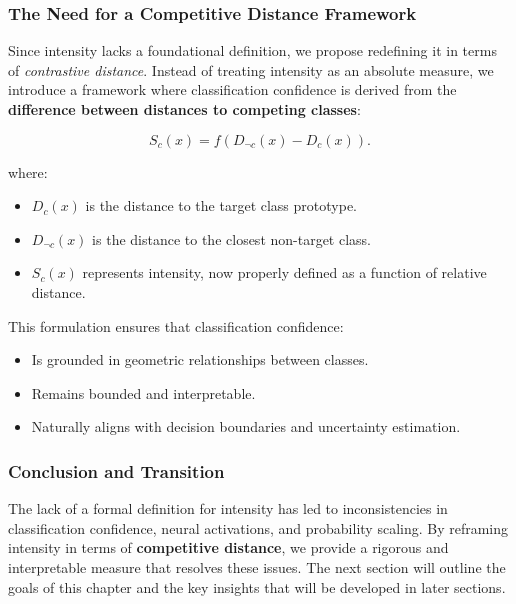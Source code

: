 \subsubsection{The Need for a Competitive Distance Framework}

Since intensity lacks a foundational definition, we propose redefining it in terms of \textit{contrastive distance}. Instead of treating intensity as an absolute measure, we introduce a framework where classification confidence is derived from the \textbf{difference between distances to competing classes}:

\[
S_c(x) = f(D_{\neg c}(x) - D_c(x)).
\]

where:

\begin{itemize}
    \item \( D_c(x) \) is the distance to the target class prototype.
    \item \( D_{\neg c}(x) \) is the distance to the closest non-target class.
    \item \( S_c(x) \) represents intensity, now properly defined as a function of relative distance.
\end{itemize}

This formulation ensures that classification confidence:

\begin{itemize}
    \item Is grounded in geometric relationships between classes.
    \item Remains bounded and interpretable.
    \item Naturally aligns with decision boundaries and uncertainty estimation.
\end{itemize}


\subsubsection{Conclusion and Transition}

The lack of a formal definition for intensity has led to inconsistencies in classification confidence, neural activations, and probability scaling. By reframing intensity in terms of \textbf{competitive distance}, we provide a rigorous and interpretable measure that resolves these issues. The next section will outline the goals of this chapter and the key insights that will be developed in later sections.
